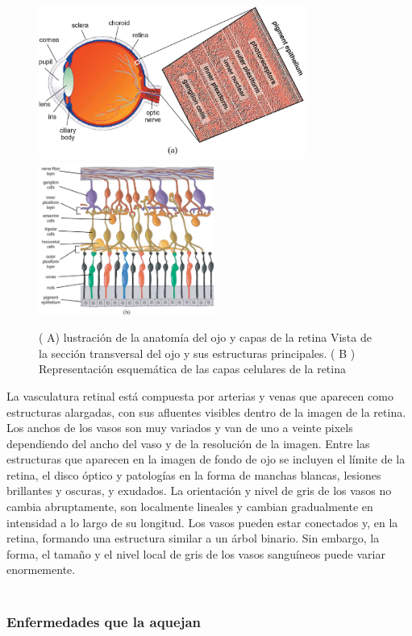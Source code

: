 \begin{figure}[H]
\centering
\includegraphics[height=5cm]{./Figures/retina_a.png}
\includegraphics[height=5cm]{./Figures/retina_b.png}
\label{fig:retina}
\caption{( A) lustración de la anatomía del ojo y capas de la retina  Vista de la sección transversal
del ojo y sus estructuras principales. ( B ) Representación esquemática de las capas celulares de la retina}
\end{figure}

La vasculatura retinal está compuesta por arterias y venas que aparecen como estructuras alargadas, con sus afluentes visibles dentro de la imagen de la retina.
Los anchos de los vasos son muy variados y van de uno a veinte pixels dependiendo del ancho del vaso y de la resolución de la imagen.
Entre las estructuras que aparecen en la imagen de fondo de ojo se incluyen el límite de la retina, el disco óptico y patologías en la forma de manchas blancas, lesiones brillantes y oscuras, y exudados.
La orientación y nivel de gris de los vasos no cambia abruptamente, son localmente lineales y cambian gradualmente en intensidad a lo largo de su longitud. Los vasos pueden estar conectados y, en la retina, formando una estructura similar a un árbol binario. Sin embargo, la forma, el tamaño y el nivel local de gris de los vasos sanguíneos puede variar enormemente.\cite{fraz2012blood}\\
\\

			\subsubsection{Enfermedades que la aquejan}

